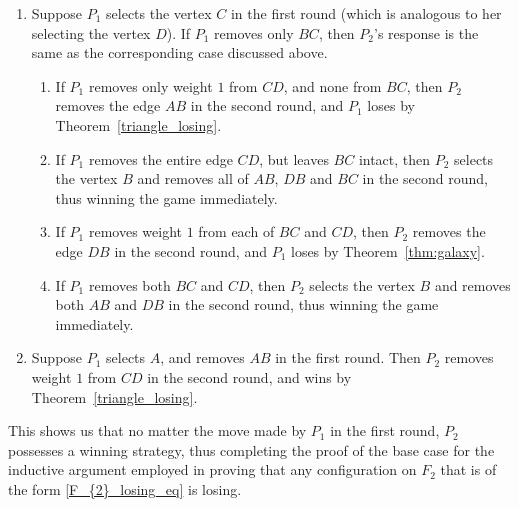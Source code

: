 \documentclass[11pt,reqno]{amsart}
\theoremstyle{definition}
\theoremstyle{definition}
\begin{document}
\begin{enumerate}
\item Suppose $P_{1}$ selects the vertex $C$ in the first round (which is analogous to her selecting the vertex $D$). If $P_{1}$ removes only $BC$, then $P_{2}$'s response is the same as the corresponding case discussed above.
\begin{enumerate}
\item If $P_{1}$ removes only weight $1$ from $CD$, and none from $BC$, then $P_{2}$ removes the edge $AB$ in the second round, and $P_{1}$ loses by Theorem~\ref{triangle_losing}. 
\item If $P_{1}$ removes the entire edge $CD$, but leaves $BC$ intact, then $P_{2}$ selects the vertex $B$ and removes all of $AB$, $DB$ and $BC$ in the second round, thus winning the game immediately.
\item If $P_{1}$ removes weight $1$ from each of $BC$ and $CD$, then $P_{2}$ removes the edge $DB$ in the second round, and $P_{1}$ loses by Theorem~\ref{thm:galaxy}.
\item If $P_{1}$ removes both $BC$ and $CD$, then $P_{2}$ selects the vertex $B$ and removes both $AB$ and $DB$ in the second round, thus winning the game immediately.
\end{enumerate}

\item Suppose $P_{1}$ selects $A$, and removes $AB$ in the first round. Then $P_{2}$ removes weight $1$ from $CD$ in the second round, and wins by Theorem~\ref{triangle_losing}.
\end{enumerate}

This shows us that no matter the move made by $P_{1}$ in the first round, $P_{2}$ possesses a winning strategy, thus completing the proof of the base case for the inductive argument employed in proving that any configuration on $F_{2}$ that is of the form \eqref{F_{2}_losing_eq} is losing.
\end{document}
